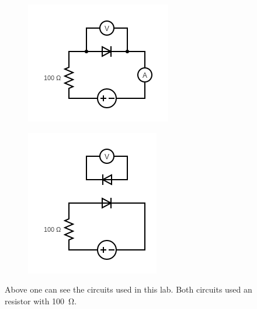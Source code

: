 \begin{figure}[H]
    \centering
    \begin{subfigure}{0.3\textwidth}
        \centering
        \includegraphics[width=\textwidth]{Figures/circuit_part1.png}
        \label{fig:part1_circuit}
    \end{subfigure}
    \hspace{2cm}
    \begin{subfigure}{0.3\textwidth}
        \centering
        \includegraphics[width=\textwidth]{Figures/circuit_part3.png}
        \label{fig:part3_circuit}
    \end{subfigure}
    \caption{Above one can see the circuits used in this lab. Both circuits used an resistor with \SI{100}{\ohm}. }
    \label{fig:circuits}
\end{figure}

